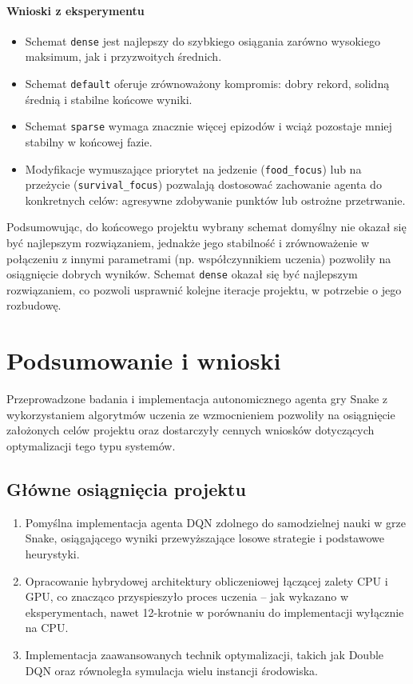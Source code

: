 \documentclass[a4paper,12pt]{article}
\begin{document}
\paragraph{Wnioski z eksperymentu}
\begin{itemize}
  \item Schemat \texttt{dense} jest najlepszy do szybkiego osiągania zarówno wysokiego maksimum, jak i przyzwoitych średnich.
  \item Schemat \texttt{default} oferuje zrównoważony kompromis: dobry rekord, solidną średnią i stabilne końcowe wyniki.
  \item Schemat \texttt{sparse} wymaga znacznie więcej epizodów i wciąż pozostaje mniej stabilny w końcowej fazie.
  \item Modyfikacje wymuszające priorytet na jedzenie (\texttt{food\_focus}) lub na przeżycie (\texttt{survival\_focus}) pozwalają dostosować zachowanie agenta do konkretnych celów: agresywne zdobywanie punktów lub ostrożne przetrwanie.
\end{itemize}

Podsumowując, do końcowego projektu wybrany schemat domyślny nie okazał się być najlepszym rozwiązaniem, jednakże jego stabilność i zrównoważenie w połączeniu z innymi parametrami (np. współczynnikiem uczenia) pozwoliły na osiągnięcie dobrych wyników. Schemat \texttt{dense} okazał się być najlepszym rozwiązaniem, co pozwoli usprawnić kolejne iteracje projektu, w potrzebie o jego rozbudowę.









\clearpage
  \section{Podsumowanie i wnioski}

Przeprowadzone badania i implementacja autonomicznego agenta gry Snake z wykorzystaniem algorytmów uczenia ze wzmocnieniem pozwoliły na osiągnięcie założonych celów projektu oraz dostarczyły cennych wniosków dotyczących optymalizacji tego typu systemów.

\subsection*{Główne osiągnięcia projektu}
\begin{enumerate}
  \item Pomyślna implementacja agenta DQN zdolnego do samodzielnej nauki w grze Snake, osiągającego wyniki przewyższające losowe strategie i podstawowe heurystyki.
  \item Opracowanie hybrydowej architektury obliczeniowej łączącej zalety CPU i GPU, co znacząco przyspieszyło proces uczenia – jak wykazano w eksperymentach, nawet 12-krotnie w porównaniu do implementacji wyłącznie na CPU.
  \item Implementacja zaawansowanych technik optymalizacji, takich jak Double DQN oraz równoległa symulacja wielu instancji środowiska.
\end{enumerate}
\end{document}
